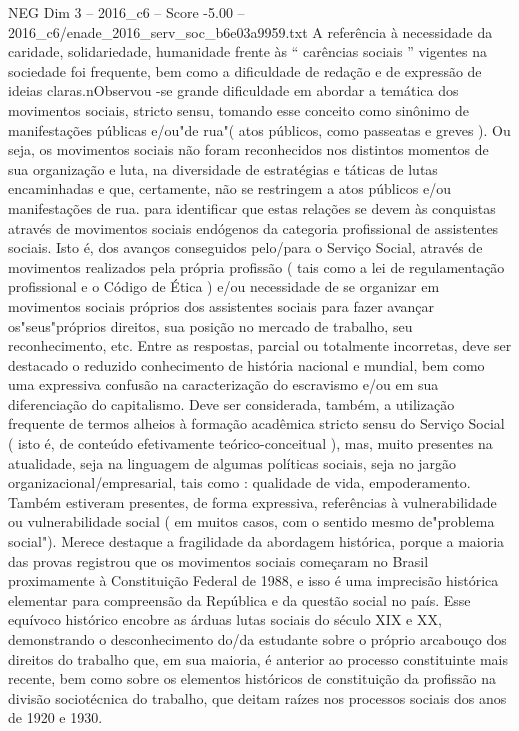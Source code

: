 \begin{textsample}{NEG Dim 3 – 2016\_c6 – Score -5.00 – 2016\_c6/enade\_2016\_serv\_soc\_b6e03a9959.txt}
A referência à necessidade da caridade, solidariedade, humanidade frente às “ carências sociais ” vigentes na sociedade foi frequente, bem como a dificuldade de redação e de expressão de ideias claras.nObservou -se grande dificuldade em abordar a temática dos movimentos sociais, stricto sensu, tomando esse conceito como sinônimo de manifestações públicas e/ou"de rua"( atos públicos, como passeatas e greves ).
Ou seja, os movimentos sociais não foram reconhecidos nos distintos momentos de sua organização e luta, na diversidade de estratégias e táticas de lutas encaminhadas e que, certamente, não se restringem a atos públicos e/ou manifestações de rua. para identificar que estas relações se devem às conquistas através de movimentos sociais endógenos da categoria profissional de assistentes sociais.
Isto é, dos avanços conseguidos pelo/para o Serviço Social, através de movimentos realizados pela própria profissão ( tais como a lei de regulamentação profissional e o Código de Ética ) e/ou necessidade de se organizar em movimentos sociais próprios dos assistentes sociais para fazer avançar os"seus"próprios direitos, sua posição no mercado de trabalho, seu reconhecimento, etc.
Entre as respostas, parcial ou totalmente incorretas, deve ser destacado o reduzido conhecimento de história nacional e mundial, bem como uma expressiva confusão na caracterização do escravismo e/ou em sua diferenciação do capitalismo.
Deve ser considerada, também, a utilização frequente de termos alheios à formação acadêmica stricto sensu do Serviço Social ( isto é, de conteúdo efetivamente teórico-conceitual ), mas, muito presentes na atualidade, seja na linguagem de algumas políticas sociais, seja no jargão organizacional/empresarial, tais como : qualidade de vida, empoderamento.
Também estiveram presentes, de forma expressiva, referências à vulnerabilidade ou vulnerabilidade social ( em muitos casos, com o sentido mesmo de"problema social").
Merece destaque a fragilidade da abordagem histórica, porque a maioria das provas registrou que os movimentos sociais começaram no Brasil proximamente à Constituição Federal de 1988, e isso é uma imprecisão histórica elementar para compreensão da República e da questão social no país.
Esse equívoco histórico encobre as árduas lutas sociais do século XIX e XX, demonstrando o desconhecimento do/da estudante sobre o próprio arcabouço dos direitos do trabalho que, em sua maioria, é anterior ao processo constituinte mais recente, bem como sobre os elementos históricos de constituição da profissão na divisão sociotécnica do trabalho, que deitam raízes nos processos sociais dos anos de 1920 e 1930.

\end{textsample}
